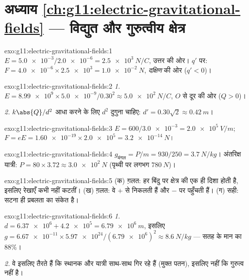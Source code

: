 \section*{अध्याय \ref{ch:g11:electric-gravitational-fields} --- विद्युत और गुरुत्वीय क्षेत्र}

\begin{solution}{exo:g11:electric-gravitational-fields:1}
$E = \num{5.0e-3} / \num{2.0e-6} = \qty{2.5e3}{N/C}$, उत्तर की ओर। $q'$ पर: $F = \num{4.0e-6} \times \num{2.5e3} = \qty{1.0e-2}{N}$, \emph{दक्षिण} की ओर ($q' < 0$)।
\end{solution}

\begin{solution}{exo:g11:electric-gravitational-fields:2}
\emph{1.} $E = \num{8.99e9} \times \num{5.0e-9} / 0.30^2
\approx \qty{5.0e2}{N/C}$, $O$ से दूर की ओर ($Q > 0$)।

\emph{2.} $k\abs{Q}/d^2$ आधा करने के लिए $d^2$ दुगुना चाहिए: $d' = 0.30\sqrt{2} \approx \qty{0.42}{m}$।
\end{solution}

\begin{solution}{exo:g11:electric-gravitational-fields:3}
$E = 600 / \num{3.0e-3} = \qty{2.0e5}{V/m}$; $F = eE = \num{1.60e-19} \times \num{2.0e5} = \qty{3.2e-14}{N}$।
\end{solution}

\begin{solution}{exo:g11:electric-gravitational-fields:4}
$g_{\text{मंगल}} = P/m = 930/250 = \qty{3.7}{N/kg}$। अंतरिक्ष यात्री: $P = 80 \times 3.72 \approx \qty{3.0e2}{N}$ (पृथ्वी पर लगभग $\qty{780}{N}$)।
\end{solution}

\begin{solution}{exo:g11:electric-gravitational-fields:5}
(क) ग़लत: हर बिंदु पर क्षेत्र की एक ही दिशा होती है, इसलिए रेखाएँ
कभी नहीं कटतीं। (ख) ग़लत: वे $+$ से निकलती हैं और $-$ पर पहुँचती हैं।
(ग) सही: सटना ही प्रबलता का संकेत है।
\end{solution}

\begin{solution}{exo:g11:electric-gravitational-fields:6}
\emph{1.} $d = \num{6.37e6} + \num{4.2e5} = \qty{6.79e6}{m}$, इसलिए $g = \num{6.67e-11} \times \num{5.97e24} / (\num{6.79e6})^2
\approx \qty{8.6}{N/kg}$ --- सतह के मान का $88\%$।

\emph{2.} वे इसलिए तैरते हैं कि स्थानक और यात्री साथ-साथ गिर रहे हैं (मुक्त
पतन), इसलिए नहीं कि गुरुत्व नहीं है।
\end{solution}

